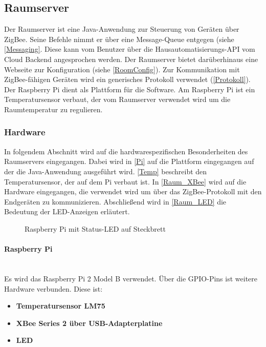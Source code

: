 \subsection{Raumserver}\label{Raumserver}
Der Raumserver ist eine Java-Anwendung zur Steuerung von Geräten über ZigBee. Seine Befehle nimmt er über eine Message-Queue entgegen (siehe \autoref{Messaging}. Diese kann vom Benutzer über die Hausautomatisierungs-API vom Cloud Backend angesprochen werden. Der Raumserver bietet darüberhinaus eine Webseite zur Konfiguration (siehe \autoref{RoomConfig}). Zur Kommunikation mit ZigBee-fähigen Geräten wird ein generisches Protokoll verwendet (\autoref{Protokoll}). Der Raspberry Pi dient als Plattform für die Software. Am Raspberry Pi ist ein Temperatursensor verbaut, der vom Raumserver verwendet wird um die Raumtemperatur zu regulieren.


\subsubsection{Hardware}\label{Raum_Hardware}
In folgendem Abschnitt wird auf die hardwarespezifischen Besonderheiten des Raumservers eingegangen. Dabei wird in \autoref{Pi} auf die Plattform eingegangen auf der die Java-Anwendung ausgeführt wird. \autoref{Temp} beschreibt den Temperatursensor, der auf dem Pi verbaut ist. In \autoref{Raum_XBee} wird auf die Hardware eingegangen, die verwendet wird um über das ZigBee-Protokoll mit den Endgeräten zu kommunizieren. Abschließend wird in \autoref{Raum_LED} die Bedeutung der LED-Anzeigen erläutert.


\begin{figure}[H]
\centering
{}
\caption{Raspberry Pi mit Status-LED auf Steckbrett}
\label{fig:pisnap}
\end{figure}


\paragraph{Raspberry Pi}\mbox{}\\\label{Pi}
Es wird das Raspberry Pi 2 Model B verwendet. Über die \ac{GPIO-Pins} ist weitere Hardware verbunden. Diese ist:
\begin{itemize}
\item \textbf{Temperatursensor LM75}
\item \textbf{XBee Series 2 über USB-Adapterplatine}
\item \textbf{LED}
\end{itemize}

